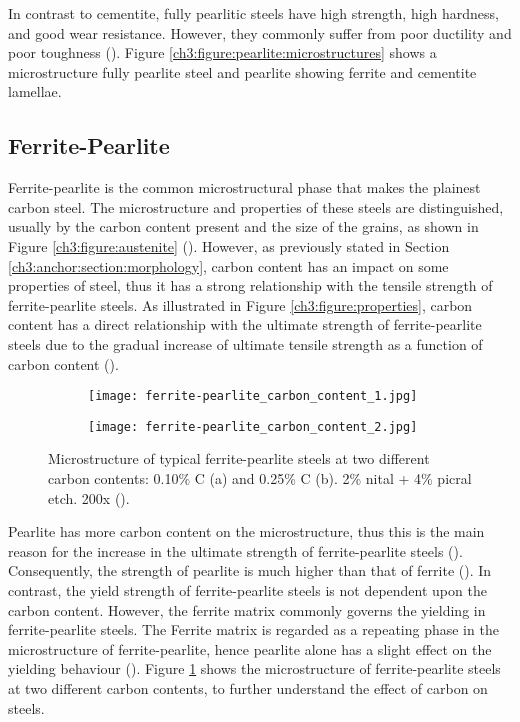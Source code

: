  In contrast to cementite, fully pearlitic steels have high strength, high hardness, and good wear resistance. However, they commonly suffer from poor ductility and poor toughness (\cite{molabe2018determining}). Figure \ref{ch3:figure:pearlite:microstructures} shows a microstructure fully pearlite steel and pearlite showing ferrite and cementite lamellae.


\subsection{Ferrite-Pearlite}
Ferrite-pearlite is the common microstructural phase that makes the plainest carbon steel. The microstructure and properties of these steels are distinguished, usually by the carbon content present and the size of the grains, as shown in Figure \ref{ch3:figure:austenite} (\cite{molabe2018determining}). However, as previously stated in Section \ref{ch3:anchor:section:morphology}, carbon content has an impact on some properties of steel, thus it has a strong relationship with the tensile strength of ferrite-pearlite steels. As illustrated in Figure \ref{ch3:figure:properties}, carbon content has a direct relationship with the ultimate strength of ferrite-pearlite steels due to the gradual increase of ultimate tensile strength as a function of carbon content (\cite{zhao2013effects}).

\begin{figure}[H]
\centering
\begin{subfigure}{.49\textwidth}
  \centering
 \texttt{[image: ferrite-pearlite\_carbon\_content\_1.jpg]}
 \caption{}
\end{subfigure}
\begin{subfigure}{.49\textwidth}
 \centering
\texttt{[image: ferrite-pearlite\_carbon\_content\_2.jpg]}
\caption{}
\end{subfigure}

\caption{Microstructure of typical ferrite-pearlite steels at two different carbon contents: 0.10\% C (a) and 0.25\% C (b). 2\% nital + 4\% picral etch. 200x (\cite{osei2015foam}).}
\label{ch3:figure:contents}
\end{figure}


Pearlite has more carbon content on the microstructure, thus this is the main reason for the increase in the ultimate strength of ferrite-pearlite steels (\cite{bajaj2020steels}). Consequently, the strength of pearlite is much higher than that of ferrite (\cite{molabe2018determining}). In contrast, the yield strength of ferrite-pearlite steels is not dependent upon the carbon content. However, the ferrite matrix commonly governs the yielding in ferrite-pearlite steels. The Ferrite matrix is regarded as a repeating phase in the microstructure of ferrite-pearlite, hence pearlite alone has a slight effect on the yielding behaviour (\cite{molabe2018determining}). Figure \ref{ch3:figure:contents} shows the microstructure of ferrite-pearlite steels at two different carbon contents, to further understand the effect of carbon on steels. 
  
